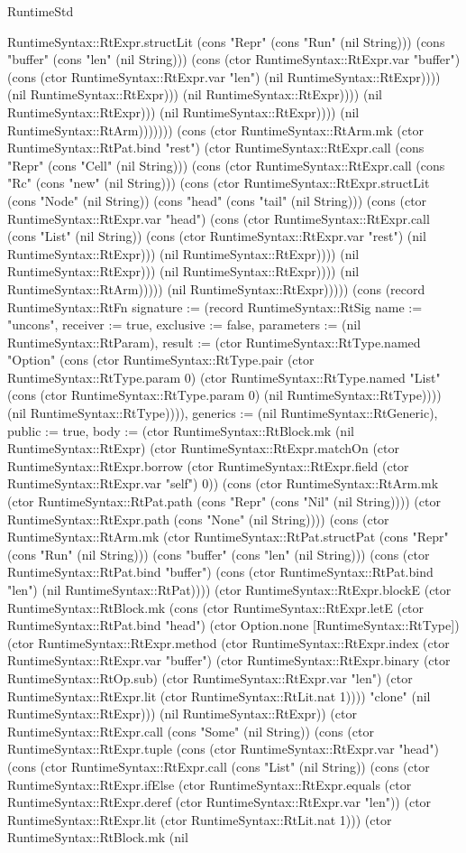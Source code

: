 \begin{lexlean}{RuntimeStd}
\begin{semanticmodule}
{RuntimeSyntax::RtExpr.structLit (cons "Repr" (cons "Run" (nil String))) (cons "buffer" (cons "len" (nil String))) (cons (ctor RuntimeSyntax::RtExpr.var "buffer") (cons (ctor RuntimeSyntax::RtExpr.var "len") (nil RuntimeSyntax::RtExpr)))) (nil RuntimeSyntax::RtExpr))) (nil RuntimeSyntax::RtExpr)))) (nil RuntimeSyntax::RtExpr))) (nil RuntimeSyntax::RtExpr)))) (nil RuntimeSyntax::RtArm))))))) (cons (ctor RuntimeSyntax::RtArm.mk (ctor RuntimeSyntax::RtPat.bind "rest") (ctor RuntimeSyntax::RtExpr.call (cons "Repr" (cons "Cell" (nil String))) (cons (ctor RuntimeSyntax::RtExpr.call (cons "Rc" (cons "new" (nil String))) (cons (ctor RuntimeSyntax::RtExpr.structLit (cons "Node" (nil String)) (cons "head" (cons "tail" (nil String))) (cons (ctor RuntimeSyntax::RtExpr.var "head") (cons (ctor RuntimeSyntax::RtExpr.call (cons "List" (nil String)) (cons (ctor RuntimeSyntax::RtExpr.var "rest") (nil RuntimeSyntax::RtExpr))) (nil RuntimeSyntax::RtExpr)))) (nil RuntimeSyntax::RtExpr))) (nil RuntimeSyntax::RtExpr)))) (nil RuntimeSyntax::RtArm))))) (nil RuntimeSyntax::RtExpr))))}) (cons (record RuntimeSyntax::RtFn {signature := (record RuntimeSyntax::RtSig {name := "uncons", receiver := true, exclusive := false, parameters := (nil RuntimeSyntax::RtParam), result := (ctor RuntimeSyntax::RtType.named "Option" (cons (ctor RuntimeSyntax::RtType.pair (ctor RuntimeSyntax::RtType.param 0) (ctor RuntimeSyntax::RtType.named "List" (cons (ctor RuntimeSyntax::RtType.param 0) (nil RuntimeSyntax::RtType)))) (nil RuntimeSyntax::RtType)))}), generics := (nil RuntimeSyntax::RtGeneric), public := true, body := (ctor RuntimeSyntax::RtBlock.mk (nil RuntimeSyntax::RtExpr) (ctor RuntimeSyntax::RtExpr.matchOn (ctor RuntimeSyntax::RtExpr.borrow (ctor RuntimeSyntax::RtExpr.field (ctor RuntimeSyntax::RtExpr.var "self") 0)) (cons (ctor RuntimeSyntax::RtArm.mk (ctor RuntimeSyntax::RtPat.path (cons "Repr" (cons "Nil" (nil String)))) (ctor RuntimeSyntax::RtExpr.path (cons "None" (nil String)))) (cons (ctor RuntimeSyntax::RtArm.mk (ctor RuntimeSyntax::RtPat.structPat (cons "Repr" (cons "Run" (nil String))) (cons "buffer" (cons "len" (nil String))) (cons (ctor RuntimeSyntax::RtPat.bind "buffer") (cons (ctor RuntimeSyntax::RtPat.bind "len") (nil RuntimeSyntax::RtPat)))) (ctor RuntimeSyntax::RtExpr.blockE (ctor RuntimeSyntax::RtBlock.mk (cons (ctor RuntimeSyntax::RtExpr.letE (ctor RuntimeSyntax::RtPat.bind "head") (ctor Option.none [RuntimeSyntax::RtType]) (ctor RuntimeSyntax::RtExpr.method (ctor RuntimeSyntax::RtExpr.index (ctor RuntimeSyntax::RtExpr.var "buffer") (ctor RuntimeSyntax::RtExpr.binary (ctor RuntimeSyntax::RtOp.sub) (ctor RuntimeSyntax::RtExpr.var "len") (ctor RuntimeSyntax::RtExpr.lit (ctor RuntimeSyntax::RtLit.nat 1)))) "clone" (nil RuntimeSyntax::RtExpr))) (nil RuntimeSyntax::RtExpr)) (ctor RuntimeSyntax::RtExpr.call (cons "Some" (nil String)) (cons (ctor RuntimeSyntax::RtExpr.tuple (cons (ctor RuntimeSyntax::RtExpr.var "head") (cons (ctor RuntimeSyntax::RtExpr.call (cons "List" (nil String)) (cons (ctor RuntimeSyntax::RtExpr.ifElse (ctor RuntimeSyntax::RtExpr.equals (ctor RuntimeSyntax::RtExpr.deref (ctor RuntimeSyntax::RtExpr.var "len")) (ctor RuntimeSyntax::RtExpr.lit (ctor RuntimeSyntax::RtLit.nat 1))) (ctor RuntimeSyntax::RtBlock.mk (nil }
\end{semanticmodule}
\end{lexlean}
